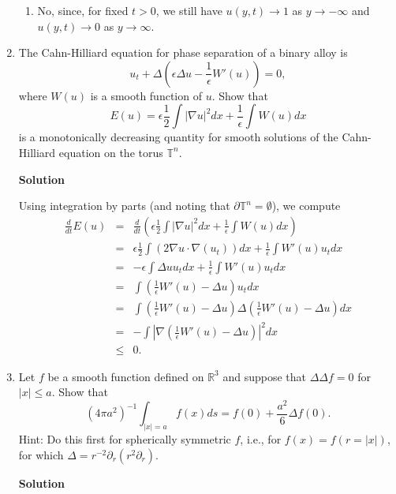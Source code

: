 \documentclass{article}
\begin{document}
\begin{enumerate}
\begin{enumerate}
\item No, since, for fixed \(t > 0\), we still have \(u(y,t) \to 1\) as \(y \to -\infty\) and \(u(y,t) \to 0\) as \(y \to \infty\).

\end{enumerate}



\item The Cahn-Hilliard equation for phase separation of a binary alloy is
\[u_t + \Delta \left( \epsilon \Delta u - \frac{1}{\epsilon} W'(u) \right) = 0,\]
where \(W(u)\) is a smooth function of \(u\).  Show that
\[E(u) = \epsilon \frac{1}{2} \int |\nabla u|^2 dx + \frac{1}{\epsilon} \int W(u) dx\]
is a monotonically decreasing quantity for smooth solutions of the Cahn-Hilliard equation on the torus \(\mathbb{T}^n\).

{\bf Solution}

Using integration by parts (and noting that \(\partial\mathbb{T}^n = \emptyset\)), we compute
\begin{eqnarray*}
\frac{d}{dt} E(u)
&   =  & \frac{d}{dt} \left( \epsilon \frac{1}{2} \int |\nabla u|^2 dx + \frac{1}{\epsilon} \int W(u) dx \right) \\
&   =  & \epsilon \frac{1}{2} \int \left( 2 \nabla u \cdot \nabla (u_t) \right) dx + \frac{1}{\epsilon} \int W'(u) u_t dx \\
&   =  & -\epsilon \int \Delta u u_t dx + \frac{1}{\epsilon} \int W'(u) u_t dx \\
&   =  & \int \left( \frac{1}{\epsilon} W'(u) - \Delta u \right) u_t dx \\
&   =  & \int \left( \frac{1}{\epsilon} W'(u) - \Delta u \right) \Delta \left( \frac{1}{\epsilon} W'(u) - \Delta u \right) dx \\
&   =  & -\int \left| \nabla \left( \frac{1}{\epsilon} W'(u) - \Delta u \right) \right|^2 dx \\
& \leq & 0.
\end{eqnarray*}



\item Let \(f\) be a smooth function defined on \(\mathbb{R}^3\) and suppose that \(\Delta \Delta f = 0\) for \(|x| \leq a\).  Show that
\[\left( 4 \pi a^2 \right)^{-1} \int_{|x| = a} f(x) ds = f(0) + \frac{a^2}{6} \Delta f(0).\]
Hint:  Do this first for spherically symmetric \(f\), i.e., for \(f(x) = f(r = |x|)\), for which \(\Delta = r^{-2} \partial_r \left( r^2 \partial_r \right)\).

{\bf Solution}


\end{enumerate}
\end{document}
